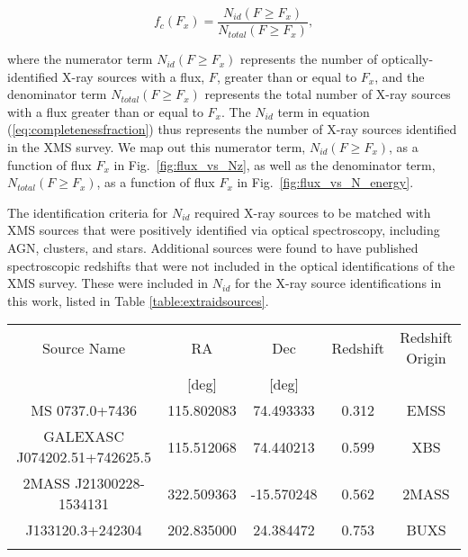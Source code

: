 \documentclass[fleqn,usenatbib]{mnras}
\begin{document}
    	\begin{equation}\label{eq:completenessfraction}
    	f_{c}(F_{x}) = \frac{N_{id}(F \geq F_{x})}{N_{total}(F \geq F_{x})},
    	\end{equation}
    
    \noindent where the numerator term $N_{id}(F \geq F_{x})$ represents the number of optically-identified X-ray sources with a flux, $F$, greater than or equal to $F_{x}$, and the denominator term $N_{total}(F \geq F_{x})$ represents the total number of X-ray sources with a flux greater than or equal to $F_{x}$. 
    The $N_{id}$ term in equation (\ref{eq:completenessfraction}) thus represents the number of X-ray sources identified in the XMS survey.
    We map out this numerator term, $N_{id}(F \geq F_{x})$, as a function of flux $F_{x}$ in Fig.~\ref{fig:flux_vs_Nz}, as well as the denominator term, $N_{total}(F \geq F_{x})$, as a function of flux $F_{x}$ in Fig.~\ref{fig:flux_vs_N_energy}.

    The identification criteria for $N_{id}$ required X-ray sources to be matched with XMS sources that were positively identified via optical spectroscopy, including AGN, clusters, and stars. 
    Additional sources were found to have published spectroscopic redshifts that were not included in the optical identifications of the XMS survey.
    These were included in $N_{id}$ for the X-ray source identifications in this work, listed in Table \ref{table:extraidsources}.
    
    
	\begin{table*}
	\caption{Spectroscopically identified sources from the literature that were not included in the optical identifications of the XMS survey. These were used in $N_{id}$ for the X-ray source identifications in this work. The table lists the catalogue from which the source was taken, the name of the source, the RA/Dec position of the source, and the spectroscopic redshift of the source.}
	\centering
    	\begin{tabular}{ccccc} 
    	\hline
    	Source Name                  & RA         & Dec         & Redshift   & Redshift Origin                      \\
    	                             & [deg]      & [deg]       &            &                                      \\
    	\addlinespace[4pt]
    	\hline
     	MS 0737.0+7436               & 115.802083 & 74.493333   & 0.312      & EMSS \citep{stocke1991zEMSS}         \\
     	GALEXASC J074202.51+742625.5 & 115.512068 & 74.440213   & 0.599      & XBS \citep{caccianiga2008zXBS}       \\
     	2MASS J21300228-1534131      & 322.509363 & -15.570248  & 0.562      & 2MASS \citep{caccianiga2004zHBS28}   \\
     	J133120.3+242304             & 202.835000 & 24.384472   & 0.753      & BUXS \citep{mateos2015revisiting}    \\
    	\addlinespace[4pt]
    	\hline
    	\label{table:extraidsources}
    	\end{tabular}
	\end{table*}
\end{document}
